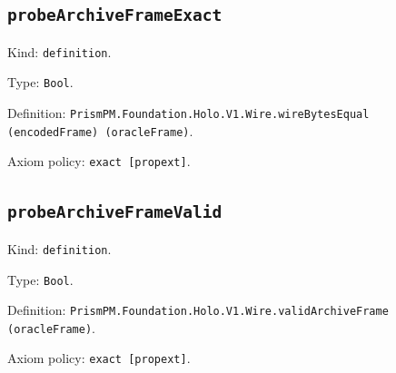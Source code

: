 \documentclass[11pt]{article}
\begin{document}
\subsection*{\texttt{probeArchiveFrameExact}}
\noindent Kind: \texttt{definition}.\par
\noindent Type: \texttt{Bool}.\par
\noindent Definition: \texttt{PrismPM.Foundation.Holo.V1.Wire.wireBytesEqual (encodedFrame) (oracleFrame)}.\par
\noindent Axiom policy: \texttt{exact [propext]}.\par
\subsection*{\texttt{probeArchiveFrameValid}}
\noindent Kind: \texttt{definition}.\par
\noindent Type: \texttt{Bool}.\par
\noindent Definition: \texttt{PrismPM.Foundation.Holo.V1.Wire.validArchiveFrame (oracleFrame)}.\par
\noindent Axiom policy: \texttt{exact [propext]}.\par
\end{document}
